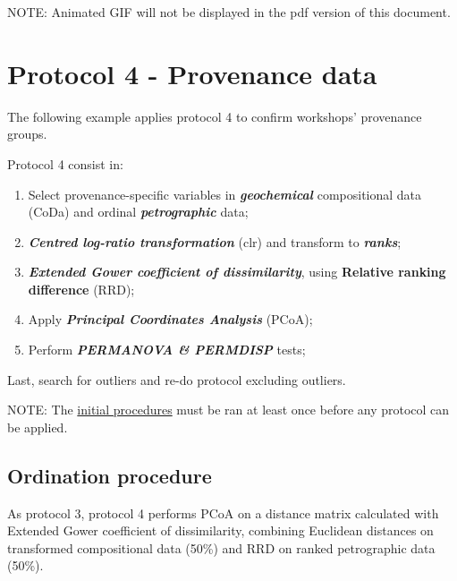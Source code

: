 \documentclass[12pt,]{book}
\providecommand{\tightlist}{%
  \setlength{\itemsep}{0pt}\setlength{\parskip}{0pt}}
\begin{document}
NOTE: Animated GIF will not be displayed in the pdf version of this document.

\hypertarget{prot4}{%
\chapter{Protocol 4 - Provenance data}\label{prot4}}

The following example applies protocol 4 to confirm workshops' provenance groups.

Protocol 4 consist in:

\begin{enumerate}
\def\labelenumi{\arabic{enumi}.}
\tightlist
\item
  Select provenance-specific variables in \textbf{\emph{geochemical}} compositional data (CoDa) and ordinal \textbf{\emph{petrographic}} data;
\item
  \textbf{\emph{Centred log-ratio transformation}} (clr) and transform to \textbf{\emph{ranks}};
\item
  \textbf{\emph{Extended Gower coefficient of dissimilarity}}, using \textbf{Relative ranking difference} (RRD);
\item
  Apply \textbf{\emph{Principal Coordinates Analysis}} (PCoA);
\item
  Perform \textbf{\emph{PERMANOVA \& PERMDISP}} tests;
\end{enumerate}

Last, search for outliers and re-do protocol excluding outliers.

NOTE: The \protect\hyperlink{init}{initial procedures} must be ran at least once before any protocol can be applied.

\hypertarget{ordination-procedure-3}{%
\section{Ordination procedure}\label{ordination-procedure-3}}

As protocol 3, protocol 4 performs PCoA on a distance matrix calculated with Extended Gower coefficient of dissimilarity, combining Euclidean distances on transformed compositional data (50\%) and RRD on ranked petrographic data (50\%).
\end{document}
